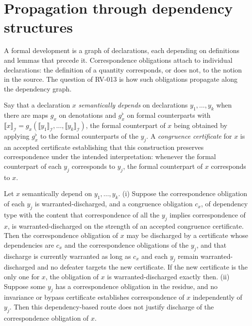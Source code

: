 \section{Propagation through dependency structures}

A formal development is a graph of declarations, each depending on definitions and lemmas that precede it. Correspondence obligations attach to individual declarations: the definition of a quantity corresponds, or does not, to the notion in the source. The question of RV-013 is how such obligations propagate along the dependency graph.

Say that a declaration $x$ \emph{semantically depends} on declarations $y_1, \dots, y_k$ when there are maps $g_x$ on denotations and $g_x^{\flat}$ on formal counterparts with $\llbracket x \rrbracket_{\mathcal{I}} = g_x(\llbracket y_1 \rrbracket_{\mathcal{I}}, \dots, \llbracket y_k \rrbracket_{\mathcal{I}})$, the formal counterpart of $x$ being obtained by applying $g_x^{\flat}$ to the formal counterparts of the $y_j$. A \emph{congruence certificate} for $x$ is an accepted certificate establishing that this construction preserves correspondence under the intended interpretation: whenever the formal counterpart of each $y_j$ corresponds to $y_j$, the formal counterpart of $x$ corresponds to $x$.

\begin{proposition}
\label{prop:rv013}
Let $x$ semantically depend on $y_1, \dots, y_k$. (i) Suppose the correspondence obligation of each $y_j$ is warranted-discharged, and a congruence obligation $c_x$, of dependency type with the content that correspondence of all the $y_j$ implies correspondence of $x$, is warranted-discharged on the strength of an accepted congruence certificate. Then the correspondence obligation of $x$ may be discharged by a certificate whose dependencies are $c_x$ and the correspondence obligations of the $y_j$, and that discharge is currently warranted as long as $c_x$ and each $y_j$ remain warranted-discharged and no defeater targets the new certificate. If the new certificate is the only one for $x$, the obligation of $x$ is warranted-discharged exactly then. (ii) Suppose some $y_j$ has a correspondence obligation in the residue, and no invariance or bypass certificate establishes correspondence of $x$ independently of $y_j$. Then this dependency-based route does not justify discharge of the correspondence obligation of $x$.
\end{proposition}

